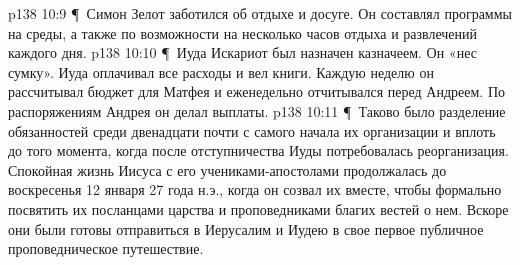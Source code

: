 \vs p138 10:9 \P\ \bibnobreakspace Симон Зелот заботился об отдыхе и досуге. Он составлял программы на среды, а также по возможности на несколько часов отдыха и развлечений каждого дня.
\vs p138 10:10 \P\ \bibnobreakspace Иуда Искариот был назначен казначеем. Он «нес сумку». Иуда оплачивал все расходы и вел книги. Каждую неделю он рассчитывал бюджет для Матфея и еженедельно отчитывался перед Андреем. По распоряжениям Андрея он делал выплаты.
\vs p138 10:11 \P\ Таково было разделение обязанностей среди двенадцати почти с самого начала их организации и вплоть до того момента, когда после отступничества Иуды потребовалась реорганизация. Спокойная жизнь Иисуса с его учениками\hyp{}апостолами продолжалась до воскресенья 12 января 27 года н.э., когда он созвал их вместе, чтобы формально посвятить их посланцами царства и проповедниками благих вестей о нем. Вскоре они были готовы отправиться в Иерусалим и Иудею в свое первое публичное проповедническое путешествие.
